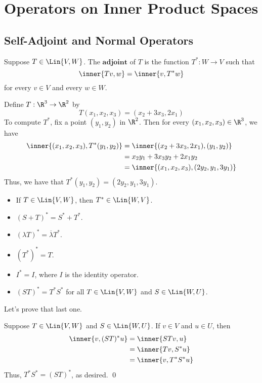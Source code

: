 
\section{Operators on Inner Product Spaces}

\subsection{Self-Adjoint and Normal Operators}

\begin{definition} [Adjoint, $T^*$]
	Suppose $T \in \Lin{V, W}$. The $\textbf{adjoint}$ of $T$ is the function $T^*: W \to V$ such that
	\[ \inner{Tv, w} = \inner{v, T^*w} \]
	for every $v \in V$ and every $w \in W$.
\end{definition}

\begin{example}
    Define $T : \R^3 \to \R^2$ by
    \[ T(x_1, x_2, x_3) = (x_2 + 3x_3, 2x_1) \]
    To compute $T^*$, fix a point $(y_1, y_2)$ in $\R^2$.
    Then for every $(x_1, x_2, x_3) \in \R^3$, we have
    \begin{align*}
        \inner{(x_1, x_2, x_3), T^*(y_1, y_2)} &= \inner{(x_2 + 3x_3, 2x_1), (y_1, y_2)} \\
        &= x_2 y_1 + 3x_3 y_2 + 2x_1 y_2 \\
        &= \inner{(x_1, x_2, x_3), (2y_2, y_1, 3y_1)}
    \end{align*}
    Thus, we have that $T^*(y_1, y_2) = (2y_2, y_1, 3y_1)$.
\end{example}

\begin{theorem} 
    \begin{itemize}
        \item If $T \in \Lin{V, W}$, then $T^* \in \Lin{W, V}$.
        \item $(S+T)^* = S^* + T^*$.
        \item $(\lambda T)^* = \overline{\lambda} T^*$.
        \item $(T^*)^* = T$.
        \item $I^* = I$, where $I$ is the identity operator.
        \item $(ST)^* = T^* S^*$ for all $T \in \Lin{V, W}$ and $S \in \Lin{W, U}$.
    \end{itemize}

    Let's prove that last one.

    \begin{proof*}
        Suppose $T \in \Lin{V, W}$ and $S \in \Lin{W, U}$. If $v \in V$ and $u \in U$, then
        \begin{align*}
            \inner{v, (ST)^* u} &= \inner{STv, u} \\
            &= \inner{Tv, S^* u} \\
            &= \inner{v, T^* S^* u} \\
        \end{align*}
        Thus, $T^* S^* = (ST)^*$, as desired. \qed
    \end{proof*}
\end{theorem}

